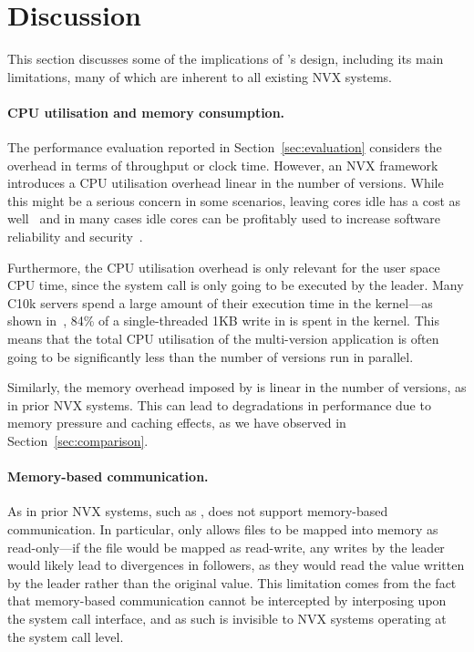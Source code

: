 \section{Discussion}
\label{efficient-execution:discussion}

This section discusses some of the implications of \varan's design,
including its main limitations, many of which are inherent to all
existing NVX systems.

\paragraph{CPU utilisation and memory consumption.} The performance
evaluation reported in Section~\ref{sec:evaluation} considers the
overhead in terms of throughput or clock time.  However, an NVX
framework introduces a CPU utilisation overhead linear in the number
of versions.  While this might be a serious concern in some scenarios,
leaving cores idle has a cost as well~\cite{barroso2007} and in many
cases idle cores can be profitably used to increase software reliability
and security~\cite{cox2006,multiplicity,orchestra09,diehard06,mvupdates12}.

Furthermore, the CPU utilisation overhead is only relevant for the user space
CPU time, since the system call is only going to be executed by the leader. Many
C10k servers spend a large amount of their execution time in the kernel---\eg as
shown in~\cite{redisoverhead}, 84\% of a single-threaded 1KB write in \redis
is spent in the kernel. This means that the total CPU utilisation of the
multi-version application is often going to be significantly less than the
number of versions run in parallel.

Similarly, the memory overhead imposed by \varan is linear in the
number of versions, as in prior NVX systems.  This can lead to
degradations in performance due to memory pressure and caching
effects, as we have observed in Section~\ref{sec:comparison}.

\paragraph{Memory-based communication.} As in prior NVX systems, such as \mx,
\varan does not support memory-based communication.  In particular, \varan only
allows files to be mapped into memory as read-only---if the file would be
mapped as read-write, any writes by the leader would likely lead to divergences
in followers, as they would read the value written by the leader rather than
the original value.  This limitation comes from the fact that memory-based
communication cannot be intercepted by interposing upon the system call
interface, and as such is invisible to NVX systems operating at the system call
level.

